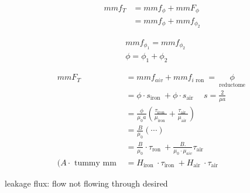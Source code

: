 \documentclass[12pt, a4paper]{article}
\begin{document}
$$
	\begin{aligned}
		m m f_{T} & =m m f_{\phi}+m m F_{\phi}     \\
		          & =m m f_{\phi}+m m f_{\phi_{2}}
	\end{aligned}
$$

$$
	\begin{aligned}
		 & m m f_{\phi_{1}}=m m f_{\phi_{2}} \\
		 & \phi=\phi_{1}+\phi_{2}
	\end{aligned}
$$

$$
	\begin{aligned}
		m m F_{T}                   & =m m f_{a i v}+m m f_{i \text { ron }}=\underset{\text { reductome }}{\phi}                                                         \\
		                            & =\phi \cdot s_{\text {iron }}+\phi \cdot s_{\text {air }} \quad s=\frac{2}{\mu a}                                                   \\
		                            & =\frac{\phi}{\mu_{0} a}\left(\frac{\tau_{\text {iron }}}{\mu_{\text {iron }}}+\frac{\tau_{\text {air }}}{\mu_{\text {air }}}\right) \\
		                            & =\frac{B}{\mu_{0}}(\cdots)                                                                                                          \\
		                            & =\frac{B}{\mu_{0}} \cdot \tau_{\text {ron }}+\frac{B .}{\mu_{0} \cdot \mu_{a i v}} \tau_{\text {air }}                              \\
		(A \cdot \text { tummy mm } & =H_{\text {iron }} \cdot \tau_{\text {iron }}+H_{\text {air }} \cdot \tau_{\text {air }}
	\end{aligned}
$$

leakage flux: flow not flowing through desired
\end{document}
